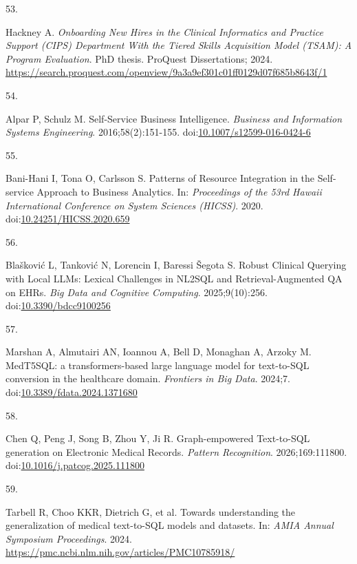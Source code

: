 \documentclass[
  american,
  11pt,
  letterpaper,
  oneside  ,captions=tableheading
]{scrartcl}
\newlength{\cslhangindent}
\newlength{\csllabelwidth}
\newenvironment{CSLReferences}[2] %
 {\begin{list}{}{%
  \setlength{\itemindent}{0pt}
  \setlength{\leftmargin}{0pt}
  \setlength{\parsep}{0pt}
  \ifodd #1
   \setlength{\leftmargin}{\cslhangindent}
   \setlength{\itemindent}{-1\cslhangindent}
  \fi
  \setlength{\itemsep}{#2\baselineskip}}}
 {\end{list}}
\newcommand{\CSLLeftMargin}[1]{\parbox[t]{\csllabelwidth}{\strut#1\strut}}
\newcommand{\CSLRightInline}[1]{\parbox[t]{\linewidth - \csllabelwidth}{\strut#1\strut}}
\begin{document}
\begin{CSLReferences}{0}{1}
\CSLLeftMargin{53. }%
\CSLRightInline{Hackney A. \emph{{Onboarding New Hires in the Clinical
Informatics and Practice Support (CIPS) Department With the Tiered
Skills Acquisition Model (TSAM): A Program Evaluation}}. PhD thesis.
ProQuest Dissertations; 2024.
\url{https://search.proquest.com/openview/9a3a9ef301c01ff0129d07f685b8643f/1}}

\CSLLeftMargin{54. }%
\CSLRightInline{Alpar P, Schulz M. {Self-Service Business Intelligence}.
\emph{Business and Information Systems Engineering}. 2016;58(2):151-155.
doi:\href{https://doi.org/10.1007/s12599-016-0424-6}{10.1007/s12599-016-0424-6}}

\CSLLeftMargin{55. }%
\CSLRightInline{Bani-Hani I, Tona O, Carlsson S. {Patterns of Resource
Integration in the Self-service Approach to Business Analytics}. In:
\emph{Proceedings of the 53rd Hawaii International Conference on System
Sciences (HICSS)}. 2020.
doi:\href{https://doi.org/10.24251/HICSS.2020.659}{10.24251/HICSS.2020.659}}

\CSLLeftMargin{56. }%
\CSLRightInline{Blašković L, Tanković N, Lorencin I, Baressi Šegota S.
{Robust Clinical Querying with Local LLMs: Lexical Challenges in NL2SQL
and Retrieval-Augmented QA on EHRs}. \emph{Big Data and Cognitive
Computing}. 2025;9(10):256.
doi:\href{https://doi.org/10.3390/bdcc9100256}{10.3390/bdcc9100256}}

\CSLLeftMargin{57. }%
\CSLRightInline{Marshan A, Almutairi AN, Ioannou A, Bell D, Monaghan A,
Arzoky M. {MedT5SQL: a transformers-based large language model for
text-to-SQL conversion in the healthcare domain}. \emph{Frontiers in Big
Data}. 2024;7.
doi:\href{https://doi.org/10.3389/fdata.2024.1371680}{10.3389/fdata.2024.1371680}}

\CSLLeftMargin{58. }%
\CSLRightInline{Chen Q, Peng J, Song B, Zhou Y, Ji R. {Graph-empowered
Text-to-SQL generation on Electronic Medical Records}. \emph{Pattern
Recognition}. 2026;169:111800.
doi:\href{https://doi.org/10.1016/j.patcog.2025.111800}{10.1016/j.patcog.2025.111800}}

\CSLLeftMargin{59. }%
\CSLRightInline{{Tarbell R, Choo KKR, Dietrich G, et al.} {Towards
understanding the generalization of medical text-to-SQL models and
datasets}. In: \emph{AMIA Annual Symposium Proceedings}. 2024.
\url{https://pmc.ncbi.nlm.nih.gov/articles/PMC10785918/}}


\end{CSLReferences}
\end{document}
